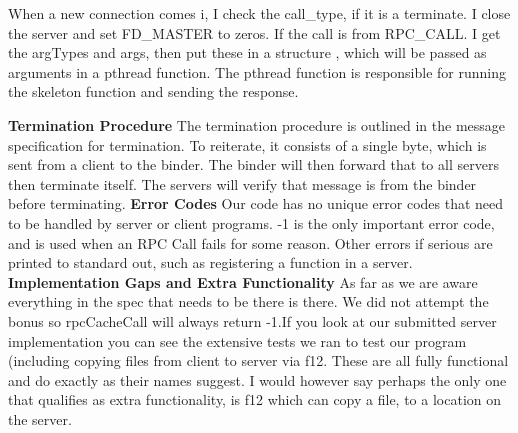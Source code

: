 \documentclass[]{article}
\begin{document}
When a new connection comes i, I check the call\_type, if it is a terminate. I close the server and set FD\_MASTER to zeros. If the call is from RPC\_CALL. I get the argTypes and args, then put these in a structure , which will be passed as arguments in a pthread function. The pthread function is responsible for running the skeleton function and sending the response. 

{\bf Termination Procedure}\newline
The termination procedure is outlined in the message specification for termination. To reiterate, it consists of a single byte, which is sent from a client to the binder. The binder will then forward that to all servers then terminate itself. The servers will verify that message is from the binder before terminating.\newline\newline
{\bf Error Codes}\newline
Our code has no unique error codes that need to be handled by server or client programs. -1 is the only important error code, and is used when an RPC Call fails for some reason. Other errors if serious are printed to standard out, such as registering a function in a server.\newline
\newline
{\bf Implementation Gaps and Extra Functionality}\newline
As far as we are aware everything in the spec that needs to be there is there. We did not attempt the bonus so rpcCacheCall will always return -1.\newline\newline If you look at our submitted server implementation you can see the extensive tests we ran to test our program (including copying files from client to server via f12. These are all fully functional and do exactly as their names suggest. I would however say perhaps the only one that qualifies as extra functionality, is f12 which can copy a file, to a location on the server.
\end{document}
